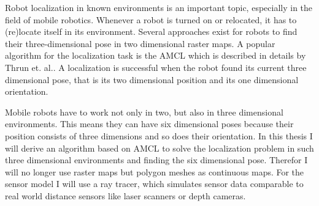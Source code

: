 \documentclass[Thesis.tex]{subfiles}
\begin{document}
Robot localization in known environments is an important topic, especially in the field of mobile robotics. Whenever a robot is turned on or relocated, it has to (re)locate itself in its environment. Several approaches exist for robots to find their three-dimensional pose in two dimensional raster maps. A popular algorithm for the localization task is the \gls{AMCL} which is described in details by Thrun et. al.\cite{ThrunBurgardFox:2005}. A localization is successful when the robot found its current three dimensional pose, that is its two dimensional position and its one dimensional orientation.

Mobile robots have to work not only in two, but also in three dimensional environments. This means they can have six dimensional poses because their position consists of three dimensions and so does their orientation. In this thesis I will derive an algorithm based on \gls{AMCL} to solve the localization problem in such three dimensional environments and finding the six dimensional pose. Therefor I will no longer use raster maps but polygon meshes as continuous maps. For the sensor model I will use a ray tracer, which simulates sensor data comparable to real world distance sensors like laser scanners or depth cameras.
\end{document}
